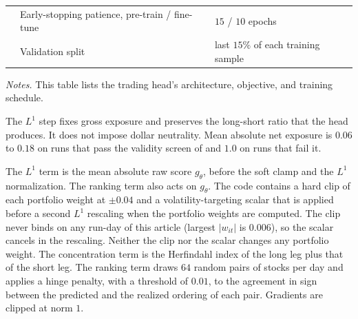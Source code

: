 \begin{table}[htbp]
\begin{threeparttable}
\begin{tabular}{@{}ll>{\raggedright\arraybackslash}p{6.0cm}@{}}
& Early-stopping patience, pre-train / fine-tune & $15$ / $10$ epochs \\
& Validation split & last $15\%$ of each training sample \\
\bottomrule
\end{tabular}
\begin{tablenotes}[flushleft]\footnotesize
\item \emph{Notes.} This table lists the trading head's architecture, objective, and training schedule.
\item[a] The $L^1$ step fixes gross exposure and preserves the long-short ratio that the head produces. It does not impose dollar
neutrality. Mean absolute net exposure is $0.06$ to $0.18$ on runs that pass the validity screen of  and $1.0$ on runs
that fail it.
\item[b] The $L^1$ term is the mean absolute raw score $g_\theta$, before the soft clamp and the $L^1$ normalization. The ranking term also acts on $g_\theta$. The code contains a hard clip of each portfolio weight at $\pm 0.04$ and a volatility-targeting scalar that is applied before a second $L^1$ rescaling when the portfolio weights are computed. The clip never binds on any run-day of this article (largest $|w_{it}|$ is $0.006$), so the scalar cancels in the rescaling. Neither the clip nor the scalar changes any portfolio weight. The
concentration term is the Herfindahl index of the long leg plus that of the short leg. The ranking term draws $64$ random pairs of stocks per day and applies a hinge penalty, with a threshold of $0.01$, to the agreement in sign between the predicted and the realized ordering of each pair. Gradients are clipped at norm $1$.
\end{tablenotes}
\end{threeparttable}
\end{table}



